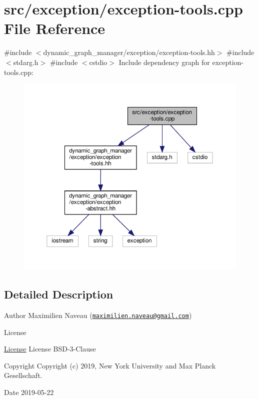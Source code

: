 \hypertarget{exception-tools_8cpp}{}\section{src/exception/exception-\/tools.cpp File Reference}
\label{exception-tools_8cpp}
{\ttfamily \#include $<$dynamic\+\_\+graph\+\_\+manager/exception/exception-\/tools.\+hh$>$}\newline
{\ttfamily \#include $<$stdarg.\+h$>$}\newline
{\ttfamily \#include $<$cstdio$>$}\newline
Include dependency graph for exception-\/tools.cpp\+:
\nopagebreak
\begin{figure}[H]
\begin{center}
\leavevmode
\includegraphics[width=350pt]{exception-tools_8cpp__incl}
\end{center}
\end{figure}


\subsection{Detailed Description}
\begin{DoxyAuthor}{Author}
Maximilien Naveau (\href{mailto:maximilien.naveau@gmail.com}{\tt maximilien.\+naveau@gmail.\+com}) 
\end{DoxyAuthor}
\begin{DoxyRefDesc}{License}
\item[\hyperlink{license__license000050}{License}]License B\+S\+D-\/3-\/\+Clause \end{DoxyRefDesc}
\begin{DoxyCopyright}{Copyright}
Copyright (c) 2019, New York University and Max Planck Gesellschaft. 
\end{DoxyCopyright}
\begin{DoxyDate}{Date}
2019-\/05-\/22 
\end{DoxyDate}
